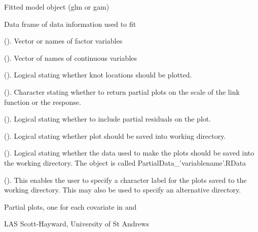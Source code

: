 \documentclass[a4paper]{book}
\begin{document}
%
\begin{Arguments}
\begin{ldescription}
\item[\code{model}] Fitted model object (glm or gam)

\item[\code{data}] Data frame of data information used to fit 

\item[\code{factorlist.in}] (). Vector or names of factor variables

\item[\code{varlist.in}] (). Vector of names of continuous variables

\item[\code{showKnots}] (). Logical stating whether knot locations should be plotted.

\item[\code{type}] ().  Character stating whether to return partial plots on the scale of the link function or the response.

\item[\code{partial.resid}] ().  Logical stating whether to include partial residuals on the plot.

\item[\code{save}] (). Logical stating whether plot should be saved into working directory.

\item[\code{savedata}] (). Logical stating whether the data used to make the plots should be saved into the working directory.  The object is called PartialData\_'variablename'.RData

\item[\code{label}] ().  This enables the user to specify a character label for the plots saved to the working directory. This may also be used to specify an alternative directory.
\end{ldescription}
\end{Arguments}
%
\begin{Value}
Partial plots, one for each covariate in  and 
\end{Value}
%
\begin{Author}\relax
LAS Scott-Hayward, University of St Andrews
\end{Author}
%
\end{document}

